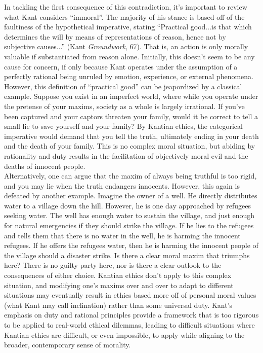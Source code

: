 \documentclass[12pt]{article}
\begin{document}
\begin{flushleft}
In tackling the first consequence of this contradiction, it's important to review what Kant considers ``immoral''. The majority of his stance is based off of the faultiness of the hypothetical imperative, stating ``Practical good...is that which determines the will by means of representations of reason, hence not by subjective causes...'' (Kant \textit{Groundwork}, 67). That is, an action is only morally valuable if substantiated from reason alone. Initially, this doesn't seem to be any cause for concern, if only because Kant operates under the assumption of a perfectly rational being unruled by emotion, experience, or external phenomena. However, this definition of ``practical good'' can be jeapordized by a classical example. Suppose you exist in an imperfect world, where while you operate under the pretense of your maxims, society as a whole is largely irrational. If you've been captured and your captors threaten your family, would it be correct to tell a small lie to save yourself and your family? By Kantian ethics, the categorical imperative would demand that you tell the truth, ultimately ending in your death and the death of your family. This is no complex moral situation, but abiding by rationality and duty results in the facilitation of objectively moral evil and the deaths of innocent people. \\
Alternatively, one can argue that the maxim of always being truthful is too rigid, and you may lie when the truth endangers innocents. However, this again is defeated by another example. Imagine the owner of a well. He directly distributes water to a village down the hill. However, he is one day approached by refugees seeking water. The well has enough water to sustain the village, and just enough for natural emergencies if they should strike the village. If he lies to the refugees and tells them that there is no water in the well, he is harming the innocent refugees. If he offers the refugees water, then he is harming the innocent people of the village should a disaster strike. Is there a clear moral maxim that triumphs here? There is no guilty party here, nor is there a clear outlook to the consequences of either choice. Kantian ethics don't apply to this complex situation, and modifying one's maxims over and over to adapt to different situations may eventually result in ethics based more off of personal moral values (what Kant may call inclination) rather than some universal duty. Kant's emphasis on duty and rational principles provide a framework that is too rigorous to be applied to real-world ethical dilemmas, leading to difficult situations where Kantian ethics are difficult, or even impossible, to apply while aligning to the broader, contemporary sense of morality.\\

\end{flushleft}
\end{document}

